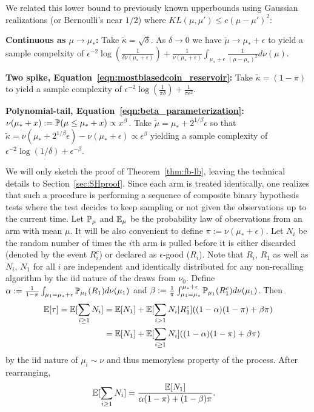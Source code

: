 \noindent We related this lower bound to previously known upperbounds using Gaussian realizations (or Bernoulli's near $1/2$) where $KL(\mu,\mu') \leq c (\mu-\mu')^2$: 

\noindent\textbf{Continuous as $\mu \rightarrow \mu_*$:} Take $\widetilde{\kappa} = \sqrt{\delta}$. As $\delta \rightarrow 0$ we have $\widetilde{\mu} \rightarrow \mu_*+\epsilon$ to yield a sample compelxity of $\epsilon^{-2} \log(\tfrac{1}{ \delta \nu(\mu_*+\epsilon)}) + \frac{1}{\nu(\mu_*+\epsilon)} \int_{\mu_*+\epsilon} \frac{1}{(\mu-\mu_*)^2} d\nu(\mu)$.

\noindent\textbf{Two spike, Equation~\ref{eqn:mostbiasedcoin_reservoir}:} Take $\widetilde{\kappa} = (1-\pi)$ to yield a sample complexity of $\epsilon^{-2} \log(\tfrac{1}{\pi \delta}) + \frac{1}{\pi \epsilon^2}$.

\noindent\textbf{Polynomial-tail, Equation~\ref{eqn:beta_parameterization}:} $\nu(\mu_* + x) := \P( \mu \leq \mu_* + x) \propto x^\beta$. Take $\widetilde{\mu} = \mu_* + 2^{1/\beta} \epsilon$ so that $\widetilde{\kappa} = \nu(\mu_*+2^{1/\beta} \epsilon) - \nu(\mu_* + \epsilon) \propto \epsilon^\beta$ yielding a sample complexity of $\epsilon^{-2}\log(1/\delta) + \epsilon^{-\beta}$.

We will only sketch the proof of Theorem~\ref{thm:fb-lb}, leaving the technical details to Section~\ref{sec:SHproof}.
Since each arm is treated identically, one realizes that such a procedure is performing a sequence of composite binary hypothesis tests where the test decides to keep sampling or not given the observations up to the current time.
Let $\P_\mu$ and $\E_\mu$ be the probability law of observations from an arm with mean $\mu$.
It will be also convenient to define $\pi:=\nu(\mu_*+\epsilon)$.
Let $N_i$ be the random number of times the $i$th arm is pulled before it is either discarded (denoted by the event $R_i^c$) or declared as $\epsilon$-good ($R_i$). 
Note that $R_i$, $R_1$ as well as $N_i$, $N_1$ for all $i$ are independent and identically distributed for any non-recalling algorithm by the iid nature of the draws from $\nu_0$.
Define $\alpha := \frac{1}{1-\pi} \int_{\mu_1 = \mu_* + \epsilon} \P_{\mu_1}(R_1) d\nu(\mu_1)$ and $\beta := \frac{1}{\pi} \int_{\mu_1 = \mu_*}^{\mu_* + \epsilon} \P_{\mu_1}(R_1^c) d\nu(\mu_1)$.
Then
\begin{align*}
\E[\tau] = \E[ \sum_{i \geq 1} N_i ]
 &= \E[N_1] + \E[\sum_{i > 1} N_i | R_1^c] ( (1-\alpha) (1-\pi) + \beta \pi) \\
&= \E[N_1] + \E[\sum_{i \geq 1} N_i ] ( (1-\alpha) (1-\pi) + \beta \pi) 
\end{align*}
by the iid nature of $\mu_i \sim \nu$ and thus memoryless property of the process.
After rearranging,
\begin{align}
\E[ \sum_{i \geq 1} N_i ] &= \frac{\E[N_1]}{\alpha (1-\pi) + (1-\beta) \pi}. \label{eqn:N1_to_many}
\end{align}

